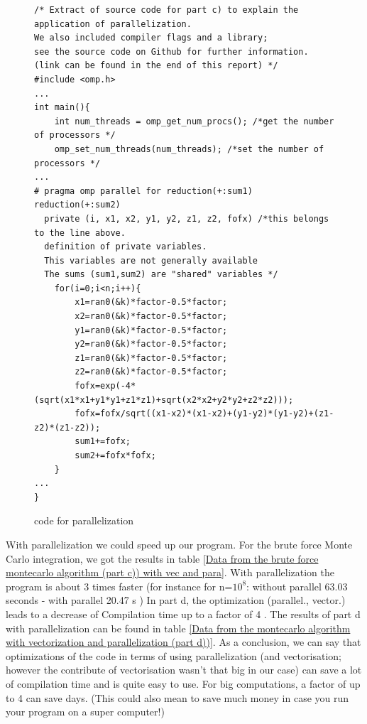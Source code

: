 \documentclass[10pt,a4paper]{article}
\begin{document}
\begin{figure}[h]
\caption{code for parallelization}
\label{code for parallel}
\begin{lstlisting}
/* Extract of source code for part c) to explain the application of parallelization.
We also included compiler flags and a library; 
see the source code on Github for further information. 
(link can be found in the end of this report) */
#include <omp.h>
...
int main(){
    int num_threads = omp_get_num_procs(); /*get the number of processors */
    omp_set_num_threads(num_threads); /*set the number of processors */
...
# pragma omp parallel for reduction(+:sum1) reduction(+:sum2) 
  private (i, x1, x2, y1, y2, z1, z2, fofx) /*this belongs to the line above. 
  definition of private variables. 
  This variables are not generally available
  The sums (sum1,sum2) are "shared" variables */
    for(i=0;i<n;i++){
        x1=ran0(&k)*factor-0.5*factor;
        x2=ran0(&k)*factor-0.5*factor;
        y1=ran0(&k)*factor-0.5*factor;
        y2=ran0(&k)*factor-0.5*factor;
        z1=ran0(&k)*factor-0.5*factor;
        z2=ran0(&k)*factor-0.5*factor;
        fofx=exp(-4*(sqrt(x1*x1+y1*y1+z1*z1)+sqrt(x2*x2+y2*y2+z2*z2)));
        fofx=fofx/sqrt((x1-x2)*(x1-x2)+(y1-y2)*(y1-y2)+(z1-z2)*(z1-z2));
        sum1+=fofx;
        sum2+=fofx*fofx;
    }
...
}
\end{lstlisting}
\end{figure}

With parallelization we could speed up our program. For the brute force Monte Carlo integration, we got the results in table \ref{Data from the brute force montecarlo algorithm (part c)) with vec and para}. With parallelization the program is about 3 times faster (for instance for n=$10^8$: without parallel 63.03 seconds - with parallel 20.47 s )
In part d, the optimization (parallel., vector.) leads to a decrease of Compilation time up to a factor of 4 . The results of part d with parallelization can be found in table \ref{Data from the  montecarlo algorithm with vectorization and parallelization (part d))}. As a conclusion, we can say that optimizations of the code in terms of using parallelization (and vectorisation; however the contribute of vectorisation wasn't that big in our case) can save a lot of compilation time and is quite easy to use. For big computations, a factor of up to 4 can save days. (This could also mean to save much money in case you run your program on a super computer!)
\end{document}
